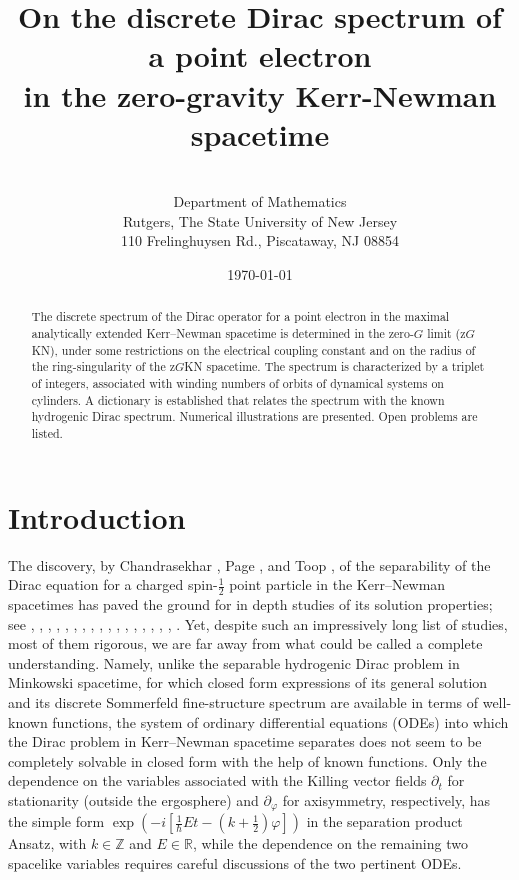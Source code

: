 \documentclass[11 pt]{article}
\title{On the discrete Dirac spectrum of a point electron \\ in the zero-gravity Kerr-Newman spacetime}
\author{\normalsize\sc{Michael K.-H. Kiessling, Eric Ling, and A. Shadi Tahvildar-Zadeh}
\\ 
       \normalsize Department of Mathematics\\
	Rutgers, The State University of New Jersey\\
	110 Frelinghuysen Rd., Piscataway, NJ 08854
}
\date{ \today}
\newcommand\bbR{{\mathbb R}}
\renewcommand\({\left(}
\renewcommand\){\right)}
\newcommand\<{\langle}
\renewcommand\>{\rangle}
\newcommand\8{\infty}
\newcommand{\Z}{\mathbb{Z}}
\begin{document}
\date{}
\maketitle


\begin{abstract}
 The discrete spectrum of the Dirac operator for a point electron in the maximal analytically extended Kerr--Newman
spacetime is determined in the zero-$G$ limit (z$G$KN), under some restrictions on the electrical coupling constant and on the
radius of the ring-singularity of the z$G$KN spacetime.
 The spectrum is characterized by a triplet of integers, associated with winding numbers of orbits of dynamical systems on cylinders.
 A dictionary is established that relates the spectrum with the known hydrogenic Dirac spectrum. 
 Numerical illustrations are presented.
 Open problems are listed.
\end{abstract}

\newpage

\tableofcontents

\newpage

\section{Introduction}
   The discovery, by Chandrasekhar \cite{Chandra76a,Chandra76b}, Page \cite{Page76}, and Toop \cite{Toop76}, of the separability of
the Dirac equation for a charged spin-$\frac12$ point particle in the Kerr--Newman spacetimes has paved the ground for in depth studies 
of its solution properties; see 
\cite{BSa},
\cite{BSb},
\cite{BSW},
\cite{BelMar99},
\cite{ChandraBHbook}, 
\cite{FKSYinCPAM2000a},
\cite{FKSYinCPAM2000b},
\cite{FKSYinCMP2002},
\cite{FKSYinATMP2003},
\cite{GairPRIZE},
\cite{KalMil91},
\cite{KTZzGKNDa},
\cite{KTZzGKNDb},
\cite{KTZzGKNDc},
\cite{Schmid},
\cite{SufFacCos83},
\cite{WinYamA},
\cite{WinYamB}.
   Yet, despite such an impressively long list of studies, most of them rigorous, we are far away from what could be called a complete understanding.
   Namely, unlike the separable hydrogenic Dirac problem in Minkowski spacetime, for which closed form expressions of its general solution
and its discrete Sommerfeld fine-structure spectrum are available in terms of well-known functions, the system of ordinary differential equations 
(ODEs) into which the Dirac problem in Kerr--Newman spacetime separates does not seem to be completely solvable in closed form with the 
help of known functions.
   Only the dependence on the variables associated with the Killing vector fields $\partial_t$ 
for stationarity (outside the ergosphere) and $\partial_\varphi$ for axisymmetry, respectively, 
has the simple form $\exp(-i[\frac1\hbar Et - (k+\frac12)\varphi])$ in the separation product Ansatz, with $k\in\Z$ and $E\in\bbR$,
while the dependence on the remaining two spacelike variables requires careful discussions of the two pertinent ODEs. 
\end{document}
